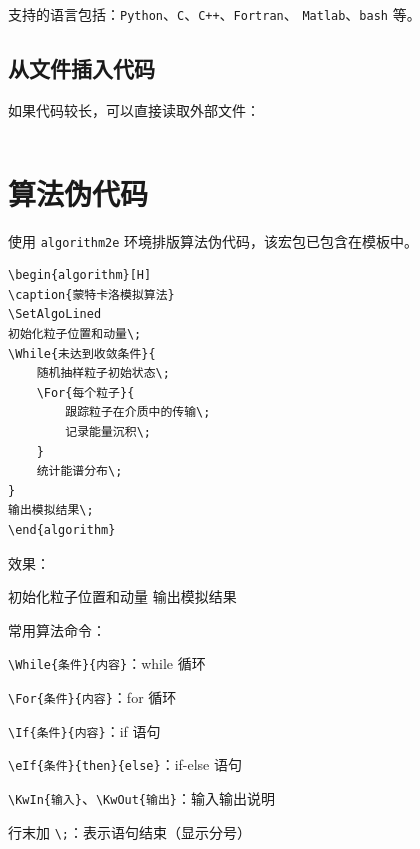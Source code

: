 支持的语言包括：\texttt{Python}、\texttt{C}、\texttt{C++}、\texttt{Fortran}、
\texttt{Matlab}、\texttt{bash} 等。

\subsection{从文件插入代码}

如果代码较长，可以直接读取外部文件：

\begin{verbatim}

\end{verbatim}

\section{算法伪代码}

使用 \texttt{algorithm2e} 环境排版算法伪代码，该宏包已包含在模板中。

\begin{verbatim}
\begin{algorithm}[H]
\caption{蒙特卡洛模拟算法}
\SetAlgoLined
初始化粒子位置和动量\;
\While{未达到收敛条件}{
    随机抽样粒子初始状态\;
    \For{每个粒子}{
        跟踪粒子在介质中的传输\;
        记录能量沉积\;
    }
    统计能谱分布\;
}
输出模拟结果\;
\end{algorithm}
\end{verbatim}

效果：

\normalem
\begin{algorithm}[H]
\caption{蒙特卡洛模拟算法}
\SetAlgoLined
初始化粒子位置和动量\;
输出模拟结果\;
\end{algorithm}
\ULforem

常用算法命令：
\begin{compactitem}
    \item \verb|\While{条件}{内容}|：while 循环
    \item \verb|\For{条件}{内容}|：for 循环
    \item \verb|\If{条件}{内容}|：if 语句
    \item \verb|\eIf{条件}{then}{else}|：if-else 语句
    \item \verb|\KwIn{输入}|、\verb|\KwOut{输出}|：输入输出说明
    \item 行末加 \verb|\;|：表示语句结束（显示分号）
\end{compactitem}

